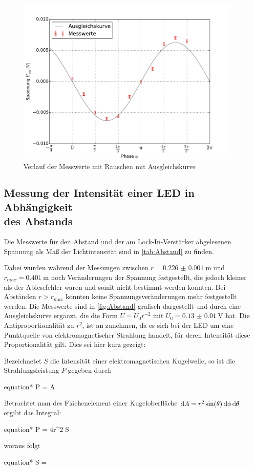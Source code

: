 	\begin{figure}[!h]
		\centering
		\includegraphics[scale=0.75]{Grafiken/MitNoise.pdf}
		\caption{Verlauf der Messwerte mit Rauschen mit Ausgleichskurve}
		\label{fig:mitNoise}
	\end{figure} 
\subsection{Messung der Intensität einer LED in Abhängigkeit  \\des Abstands} \label{sec:Abstand}
	Die Messwerte für den Abstand und der am Lock-In-Verstärker abgelesenen Spannung als Maß der Lichtintensität
	sind in \cref{tab:Abstand} zu finden. 
	
	
	
	Dabei wurden während der Messungen zwischen $r = \SI{0.226(1)}{\meter}$ und $r_{max} = \SI{0.401}{\meter}$ 
	noch Veränderungen der Spannung festgestellt, die jedoch kleiner als der Ablesefehler waren und somit nicht bestimmt
	werden konnten. Bei Abständen $r > r_{max}$ konnten keine Spannungsveränderungen mehr festgestellt werden.
	Die Messwerte sind in \cref{fig:Abstand} grafisch dargestellt und durch eine Ausgleichskurve ergänzt, die 
	die Form $U = U_{0}r^{-2}$ mit $U_{0}= \SI{0.13(1)}{\volt}$ hat. Die Antiproportionalität zu $r^{2}$, ist an
	zunehmen, da es sich bei der LED um eine Punktquelle von elektromagnetischer Strahlung handelt, für deren Intensität
	diese Proportionalität gilt. Dies sei hier kurz gezeigt:
	
	Bezeichnetet $S$ die Intensität einer elektromagnetischen Kugelwelle, so ist die Strahlungsleistung $P$ gegeben durch
	\begin{empheq}{equation*}
		P = \dif A
	\end{empheq}    
	Betrachtet man des Flächenelement einer Kugeloberfläche $\dif A = r^{2} \sin(\theta) \dif\phi \dif\theta$ ergibt das Integral:
	\begin{empheq}{equation*}
	 	P =  4\pi r^{2} \cdot S
	\end{empheq}  
	woraus folgt
	\begin{empheq}{equation*}
	 	S =  \propto {}
	\end{empheq} 
	
